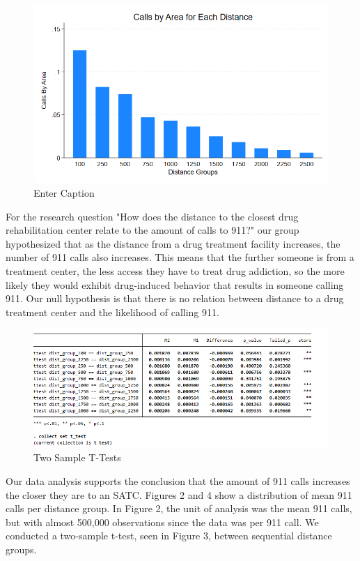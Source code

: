 \documentclass[12pt]{article}
\begin{document}
\begin{figure}[ht]
    \centering
    \includegraphics[width=1\linewidth]{Reproducibility Package//Visual Graphics/Avg_Calls_per_Distance_Group.png}
    \caption{Enter Caption}
    \label{fig: Average Number of Calls per Distance Group}
\end{figure}
For the research question "How does the distance to the closest drug rehabilitation center relate to the amount of calls to 911?" our group hypothesized that as the distance from a drug treatment facility increases, the number of 911 calls also increases. This means that the further someone is from a treatment center, the less access they have to treat drug addiction, so the more likely they would exhibit drug-induced behavior that results in someone calling 911. Our null hypothesis is that there is no relation between distance to a drug treatment center and the likelihood of calling 911. 
\begin{figure}[hb]
    \centering
    \includegraphics[width=1\linewidth]{Reproducibility Package//Visual Graphics/t_test_ss.png}
    \caption{Two Sample T-Tests}
    \label{fig:enter-label}
\end{figure}
Our data analysis supports the conclusion that the amount of 911 calls increases the closer they are to an SATC. Figures 2 and 4 show a distribution of mean 911 calls per distance group. In Figure 2, the unit of analysis was the mean 911 calls, but with almost 500,000 observations since the data was per 911 call. We conducted a two-sample t-test, seen in Figure 3, between sequential distance groups. 
\end{document}
